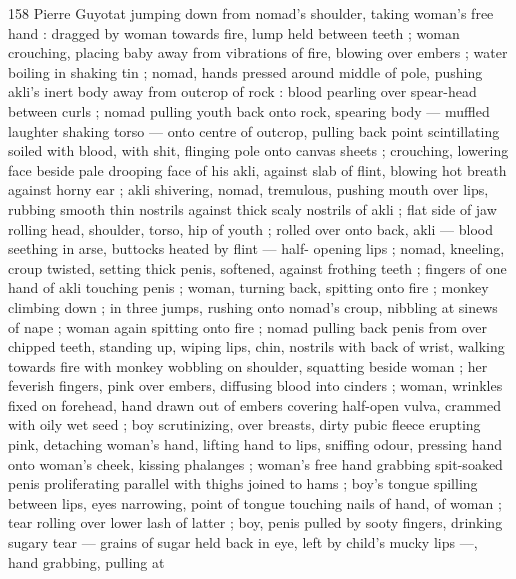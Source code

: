158 Pierre Guyotat
jumping down from nomad's shoulder, taking woman's free hand :
dragged by woman towards fire, lump held between teeth ; woman
crouching, placing baby away from vibrations of fire, blowing over
embers ; water boiling in shaking tin ; nomad, hands pressed around
middle of pole, pushing akli's inert body away from outcrop of rock
: blood pearling over spear-head between curls ; nomad pulling
youth back onto rock, spearing body — muffled laughter shaking
torso — onto centre of outcrop, pulling back point scintillating
soiled with blood, with shit, flinging pole onto canvas sheets ;
crouching, lowering face beside pale drooping face of his akli,
against slab of flint, blowing hot breath against horny ear ; akli
shivering, nomad, tremulous, pushing mouth over lips, rubbing
smooth thin nostrils against thick scaly nostrils of akli ; flat side of
jaw rolling head, shoulder, torso, hip of youth ; rolled over onto back,
akli — blood seething in arse, buttocks heated by flint — half-
opening lips ; nomad, kneeling, croup twisted, setting thick penis,
softened, against frothing teeth ; fingers of one hand of akli
touching penis ; woman, turning back, spitting onto fire ; monkey
climbing down ; in three jumps, rushing onto nomad’s croup, nibbling
at sinews of nape ; woman again spitting onto fire ; nomad pulling
back penis from over chipped teeth, standing up, wiping lips, chin,
nostrils with back of wrist, walking towards fire with monkey wobbling
on shoulder, squatting beside woman ; her feverish fingers, pink over
embers, diffusing blood into cinders ; woman, wrinkles fixed on
forehead, hand drawn out of embers covering half-open vulva,
crammed with oily wet seed ; boy scrutinizing, over breasts, dirty
pubic fleece erupting pink, detaching woman's hand, lifting hand to
lips, sniffing odour, pressing hand onto woman's cheek, kissing
phalanges ; woman's free hand grabbing spit-soaked penis
proliferating parallel with thighs joined to hams ; boy's tongue
spilling between lips, eyes narrowing, point of tongue touching nails
of hand, of woman ; tear rolling over lower lash of latter ; boy, penis
pulled by sooty fingers, drinking sugary tear — grains of sugar held
back in eye, left by child's mucky lips —, hand grabbing, pulling at

